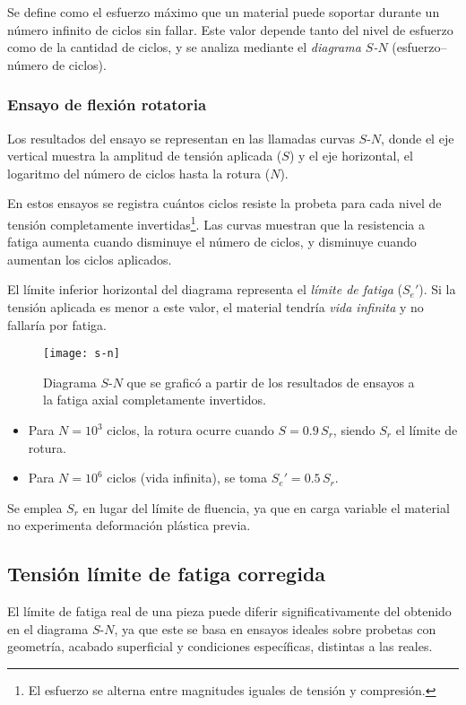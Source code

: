 \documentclass[spanish,11pt,a4paper]{article}
\begin{document}
	
	Se define como el esfuerzo máximo que un material puede soportar durante un número infinito de ciclos sin fallar. Este valor depende tanto del nivel de esfuerzo como de la cantidad de ciclos, y se analiza mediante el \emph{diagrama $S$-$N$} (esfuerzo–número de ciclos).
	
	\subsubsection{Ensayo de flexión rotatoria}
	
	Los resultados del ensayo se representan en las llamadas curvas $S$-$N$, donde el eje vertical muestra la amplitud de tensión aplicada ($S$) y el eje horizontal, el logaritmo del número de ciclos hasta la rotura ($N$).
	
	
	En estos ensayos se registra cuántos ciclos resiste la probeta para cada nivel de tensión completamente invertidas\footnote{El esfuerzo se alterna entre magnitudes iguales de tensión y compresión.}. Las curvas muestran que la resistencia a fatiga aumenta cuando disminuye el número de ciclos, y disminuye cuando aumentan los ciclos aplicados.
	
	
	El límite inferior horizontal del diagrama representa el \emph{límite de fatiga} ($S_e'$). Si la tensión aplicada es menor a este valor, el material tendría \emph{vida infinita} y no fallaría por fatiga.
	\begin{figure}[h]
		\centering\caption{Diagrama $S$-$N$ que se graficó a partir de los resultados de ensayos a la fatiga axial completamente invertidos.}\label{fig:s-n}
		\texttt{[image: s-n]}
	\end{figure}
	\begin{itemize}
		\item Para $N = 10^3$ ciclos, la rotura ocurre cuando $S = 0.9\,S_r$, siendo $S_r$ el límite de rotura.
		\item Para $N = 10^6$ ciclos (vida infinita), se toma $S_e' = 0.5\,S_r$.
	\end{itemize}
	
	Se emplea $S_r$ en lugar del límite de fluencia, ya que en carga variable el material no experimenta deformación plástica previa.
	
	\subsection{Tensión límite de fatiga corregida}
	
	El límite de fatiga real de una pieza puede diferir significativamente del obtenido en el diagrama $S$-$N$, ya que este se basa en ensayos ideales sobre probetas con geometría, acabado superficial y condiciones específicas, distintas a las reales.
	
\end{document}
